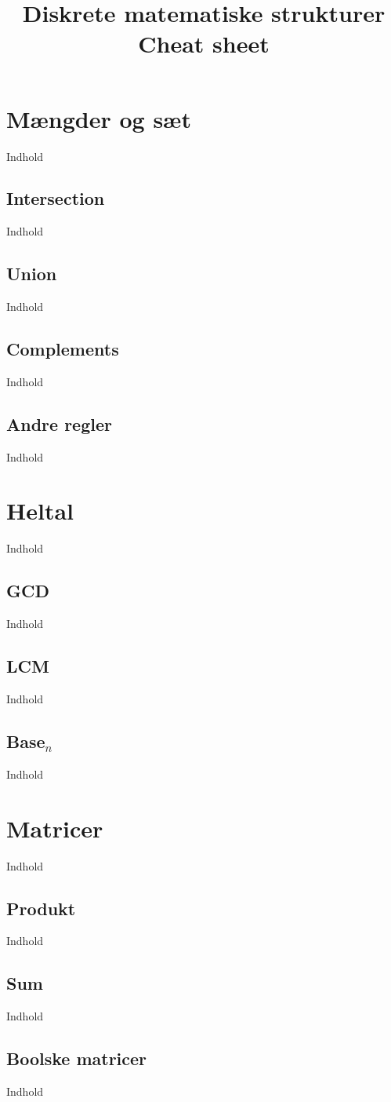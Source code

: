 \documentclass{article}
\title{Diskrete matematiske strukturer\\ 
          Cheat sheet}
\author {}
\begin{document}
\maketitle
\tableofcontents
\clearpage
\section{Mængder og sæt}
  Indhold
  \subsection{Intersection}
    Indhold
  \subsection{Union}
    Indhold
  \subsection{Complements}
    Indhold
  \subsection{Andre regler}
    Indhold
\section{Heltal}
  Indhold
  \subsection{GCD}
    Indhold
  \subsection{LCM}
    Indhold
  \subsection{Base$_n$}
    Indhold
\section{Matricer}
  Indhold
  \subsection{Produkt}
    Indhold
  \subsection{Sum}
    Indhold
  \subsection{Boolske matricer}
    Indhold
\end{document}
